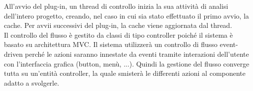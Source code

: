


All'avvio del plug-in, un thread di controllo inizia la sua attività di analisi dell'intero progetto, creando, nel caso in cui sia stato effettuato il primo avvio, la cache. Per avvii successivi del plug-in, la cache viene aggiornata dal thread.
\\
Il controllo del flusso è gestito da classi di tipo controller poiché il sistema è basato su architettura MVC. Il sistema utilizzerà un controllo di flusso event-driven perché le azioni saranno innestate da eventi tramite interazioni dell'utente con l'interfaccia grafica (button, menù, ...). Quindi la gestione del flusso converge tutta su un'entità controller, la quale smisterà le differenti azioni al componente adatto a svolgerle.